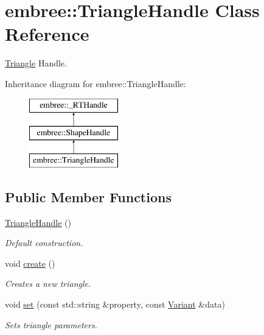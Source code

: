 \hypertarget{classembree_1_1_triangle_handle}{
\section{embree::TriangleHandle Class Reference}
\label{classembree_1_1_triangle_handle}
}


\hyperlink{classembree_1_1_triangle}{Triangle} Handle.  


Inheritance diagram for embree::TriangleHandle:\begin{figure}[H]
\begin{center}
\leavevmode
\includegraphics[height=3.000000cm]{classembree_1_1_triangle_handle}
\end{center}
\end{figure}
\subsection*{Public Member Functions}
\begin{DoxyCompactItemize}
\item 
\hyperlink{classembree_1_1_triangle_handle_a657a32a852f70c7fe25a71cf9d53b85f}{TriangleHandle} ()
\begin{DoxyCompactList}\small\item\em Default construction. \item\end{DoxyCompactList}\item 
void \hyperlink{classembree_1_1_triangle_handle_ad61c7bac38e943b35fd996f900c4cd6c}{create} ()
\begin{DoxyCompactList}\small\item\em Creates a new triangle. \item\end{DoxyCompactList}\item 
void \hyperlink{classembree_1_1_triangle_handle_a90619ddedb2908b02b334bf844767693}{set} (const std::string \&property, const \hyperlink{structembree_1_1_variant}{Variant} \&data)
\begin{DoxyCompactList}\small\item\em Sets triangle parameters. \item\end{DoxyCompactList}\end{DoxyCompactItemize}
